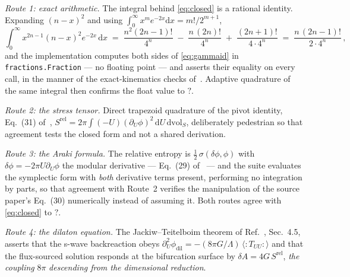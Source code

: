 \documentclass[11pt,a4paper]{article}
\newcommand{\NFRouteMaxArakiDev}{?}\newcommand{\NFRouteMaxJTDev}{?}
\newcommand{\NFRouteMaxQuadDev}{?}\newcommand{\NFThetaN}{?}
\newcommand{\Srel}{S^{\mathrm{rel}}}
\newcommand{\dd}{\mathrm{d}}
\theoremstyle{plain}
\theoremstyle{definition}
\begin{document}
\emph{Route 1: exact arithmetic.} The integral behind \cref{eq:closed}
is a rational identity. Expanding $(n-x)^2$ and using
$\int_0^\infty x^m e^{-2x}\dd x = m!/2^{m+1}$,
%
\begin{equation}
\int_0^\infty x^{2n-1}(n-x)^2 e^{-2x}\,\dd x
\;=\;
\frac{n^2 (2n-1)!}{4^{n}} \;-\; \frac{n\,(2n)!}{4^{n}}
\;+\; \frac{(2n+1)!}{4\cdot 4^{n}}
\;=\;
\frac{n\,(2n-1)!}{2\cdot 4^{n}}\,,
\label{eq:gammaid}
\end{equation}
%
and the implementation computes both sides of \cref{eq:gammaid} in
\texttt{fractions.Fraction} --- no floating point --- and asserts their
equality on every call, in the manner of the exact-kinematics checks
of~\cite{SuppTwistor}. Adaptive quadrature of the same integral then confirms
the float value to $\NFRouteMaxQuadDev$.

\emph{Route 2: the stress tensor.} Direct trapezoid quadrature of the pivot
identity, Eq.~(31) of~\cite{NariaiI}, $\Srel = 2\pi \int (-U)
(\partial_U\phi)^2\, \dd U\, \dd\mathrm{vol}_S$, deliberately pedestrian so
that agreement tests the closed form and not a shared derivation.

\emph{Route 3: the Araki formula.} The relative entropy is
$\tfrac12\,\sigma(\delta\phi, \phi)$ with $\delta\phi = -2\pi U
\partial_U\phi$ the modular derivative --- Eq.~(29) of~\cite{NariaiI} ---
and the suite evaluates the symplectic form with \emph{both} derivative terms
present, performing no integration by parts, so that agreement with Route~2
verifies the manipulation of the source paper's Eq.~(30) numerically instead
of assuming it. Both routes agree with \cref{eq:closed} to
$\NFRouteMaxArakiDev$.

\emph{Route 4: the dilaton equation.} The Jackiw--Teitelboim theorem of
Ref.~\cite{NariaiI}, Sec.~4.5, asserts that the s-wave backreaction obeys
$\partial_U^2 \phi_{\mathrm{dil}} = -(8\pi G/\Lambda)\,
\langle{:}T_{UU}{:}\rangle$ and that the flux-sourced solution responds at
the bifurcation surface by $\delta A = 4G\,\Srel$, 
\emph{the coupling} $8\pi$ \emph{descending from the dimensional reduction}. 

\bigskip
\end{document}
